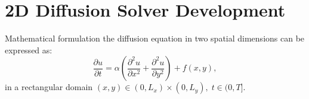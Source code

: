\documentclass{article}
\begin{document}

	\newpage
	\section{2D Diffusion Solver Development}
		Mathematical formulation the diffusion equation in two spatial dimensions can be expressed as:
		\[
		\frac{\partial u}{\partial t} = \alpha \left( \frac{\partial^2 u}{\partial x^2} + \frac{\partial^2 u}{\partial y^2} \right) + f(x, y),
		\]
		in a rectangular domain \( (x, y) \in (0, L_x) \times (0, L_y), \; t \in (0, T] \).
		
\end{document}

